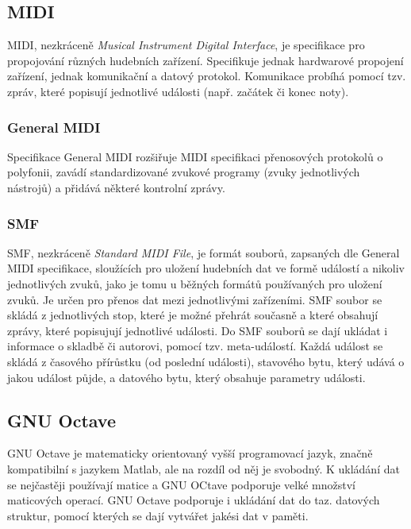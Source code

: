\documentclass[12pt,a4paper,titlepage]{article}
\begin{document}
\subsection{MIDI}
MIDI, nezkráceně \emph{Musical Instrument Digital Interface}, je specifikace pro propojování různých hudebních zařízení. Specifikuje jednak hardwarové propojení zařízení, jednak komunikační a datový protokol. Komunikace probíhá pomocí tzv. zpráv, které popisují jednotlivé události (např. začátek či konec noty).
\subsubsection{General MIDI}
Specifikace General MIDI rozšiřuje MIDI specifikaci přenosových protokolů o polyfonii, zavádí standardizované zvukové programy (zvuky jednotlivých nástrojů) a přidává některé kontrolní zprávy.
\subsubsection{SMF}
SMF, nezkráceně \emph{Standard MIDI File}, je formát souborů, zapsaných dle General MIDI specifikace, sloužících pro uložení hudebních dat ve formě událostí a nikoliv jednotlivých zvuků, jako je tomu u běžných formátů používaných pro uložení zvuků. Je určen pro přenos dat mezi jednotlivými zařízeními. SMF soubor se skládá z jednotlivých stop, které je možné přehrát současně a které obsahují zprávy, které popisujují jednotlivé události. Do SMF souborů se dají ukládat i informace o skladbě či autorovi, pomocí tzv. meta-událostí. Každá událost se skládá z časového přírůstku (od poslední události), stavového bytu, který udává o jakou událost půjde, a datového bytu, který obsahuje parametry události.
\subsection{GNU Octave}
GNU Octave je matematicky orientovaný vyšší programovací jazyk, značně kompatibilní s jazykem Matlab, ale na rozdíl od něj je svobodný. K ukládání dat se nejčastěji používají matice a GNU OCtave podporuje velké množství maticových operací. GNU Octave podporuje i ukládání dat do taz. datových struktur, pomocí kterých se dají vytvářet jakési  dat v paměti.
\newpage
\end{document}
